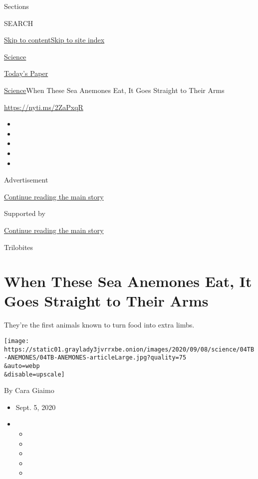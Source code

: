 Sections

SEARCH

\protect\hyperlink{site-content}{Skip to
content}\protect\hyperlink{site-index}{Skip to site index}

\href{https://www.nytimes3xbfgragh.onion/section/science}{Science}

\href{https://myaccount.nytimes3xbfgragh.onion/auth/login?response_type=cookie\&client_id=vi}{}

\href{https://www.nytimes3xbfgragh.onion/section/todayspaper}{Today's
Paper}

\href{/section/science}{Science}\textbar{}When These Sea Anemones Eat,
It Goes Straight to Their Arms

\url{https://nyti.ms/2ZaPxqR}

\begin{itemize}
\item
\item
\item
\item
\item
\end{itemize}

Advertisement

\protect\hyperlink{after-top}{Continue reading the main story}

Supported by

\protect\hyperlink{after-sponsor}{Continue reading the main story}

Trilobites

\hypertarget{when-these-sea-anemones-eat-it-goes-straight-to-their-arms}{%
\section{When These Sea Anemones Eat, It Goes Straight to Their
Arms}\label{when-these-sea-anemones-eat-it-goes-straight-to-their-arms}}

They're the first animals known to turn food into extra limbs.

\texttt{[image: https://static01.graylady3jvrrxbe.onion/images/2020/09/08/science/04TB-ANEMONES/04TB-ANEMONES-articleLarge.jpg?quality=75\\\&auto=webp\\\&disable=upscale]}

By Cara Giaimo

\begin{itemize}
\item
  Sept. 5, 2020
\item
  \begin{itemize}
  \item
  \item
  \item
  \item
  \item
  \end{itemize}
\end{itemize}

